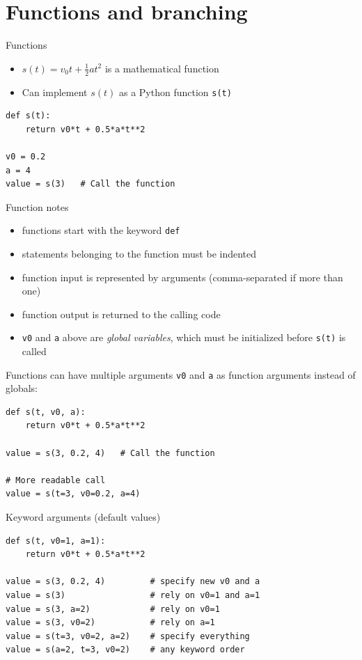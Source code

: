 \section{Functions and branching}

\begin{frame}[fragile]{Functions}
  \begin{itemize}
    \item $s(t)=v_0t + \frac{1}{2}at^2$ is a mathematical function
    \item Can implement $s(t)$ as a Python function \texttt{s(t)}
  \end{itemize}
\begin{lstlisting}[style=pythoncompact]
def s(t):
    return v0*t + 0.5*a*t**2

v0 = 0.2
a = 4
value = s(3)   # Call the function
\end{lstlisting}
\end{frame}

\begin{frame}{Function notes}
  \begin{itemize}
    \item functions start with the keyword \texttt{def}
    \item statements belonging to the function must be indented
    \item function input is represented by arguments
          (comma-separated if more than one)
    \item function output is returned to the calling code
    \item \texttt{v0} and \texttt{a} above are \emph{global variables},
          which must be initialized before \texttt{s(t)} is called
  \end{itemize}
\end{frame}

\begin{frame}[fragile]{Functions can have multiple arguments}
  \texttt{v0} and \texttt{a} as function arguments instead of globals:
\begin{lstlisting}[style=pythoncompact]
def s(t, v0, a):
    return v0*t + 0.5*a*t**2

value = s(3, 0.2, 4)   # Call the function

# More readable call
value = s(t=3, v0=0.2, a=4)
\end{lstlisting}
\end{frame}

\begin{frame}[fragile]{Keyword arguments (default values)}
\begin{lstlisting}[style=pythoncompact]
def s(t, v0=1, a=1):
    return v0*t + 0.5*a*t**2

value = s(3, 0.2, 4)         # specify new v0 and a
value = s(3)                 # rely on v0=1 and a=1
value = s(3, a=2)            # rely on v0=1
value = s(3, v0=2)           # rely on a=1
value = s(t=3, v0=2, a=2)    # specify everything
value = s(a=2, t=3, v0=2)    # any keyword order
\end{lstlisting}
\end{frame}

